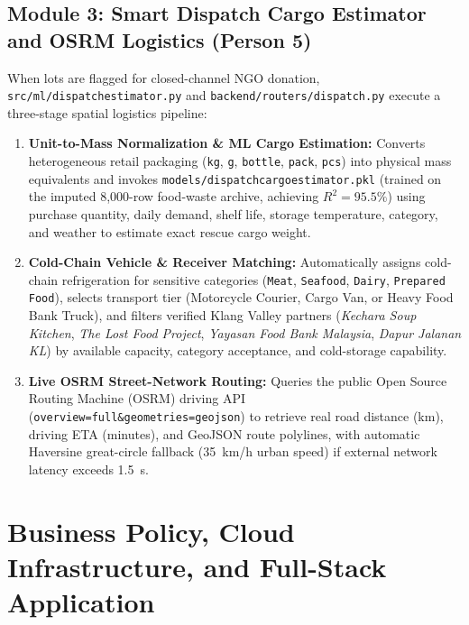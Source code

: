 \documentclass[11pt,a4paper]{article}
\renewcommand{\_}{\oldunderscore\allowbreak}
\begin{document}
\subsection{Module 3: Smart Dispatch Cargo Estimator and OSRM Logistics (Person 5)}
When lots are flagged for closed-channel NGO donation, \texttt{src/ml/dispatch\_estimator.py} and \texttt{backend/routers/dispatch.py} execute a three-stage spatial logistics pipeline:
\begin{enumerate}[leftmargin=18pt, itemsep=2pt]
    \item \textbf{Unit-to-Mass Normalization \& ML Cargo Estimation:} Converts heterogeneous retail packaging (\texttt{kg}, \texttt{g}, \texttt{bottle}, \texttt{pack}, \texttt{pcs}) into physical mass equivalents and invokes \texttt{models/dispatch\_cargo\_estimator.pkl} (trained on the imputed 8,000-row food-waste archive, achieving \textbf{$R^2 = 95.5\%$}) using purchase quantity, daily demand, shelf life, storage temperature, category, and weather to estimate exact rescue cargo weight.
    \item \textbf{Cold-Chain Vehicle \& Receiver Matching:} Automatically assigns cold-chain refrigeration for sensitive categories (\texttt{Meat}, \texttt{Seafood}, \texttt{Dairy}, \texttt{Prepared Food}), selects transport tier (Motorcycle Courier, Cargo Van, or Heavy Food Bank Truck), and filters verified Klang Valley partners (\emph{Kechara Soup Kitchen}, \emph{The Lost Food Project}, \emph{Yayasan Food Bank Malaysia}, \emph{Dapur Jalanan KL}) by available capacity, category acceptance, and cold-storage capability.
    \item \textbf{Live OSRM Street-Network Routing:} Queries the public Open Source Routing Machine (OSRM) driving API (\texttt{overview=full\&geometries=geojson}) to retrieve real road distance (km), driving ETA (minutes), and GeoJSON route polylines, with automatic Haversine great-circle fallback (35~km/h urban speed) if external network latency exceeds 1.5~s.
\end{enumerate}

\section{Business Policy, Cloud Infrastructure, and Full-Stack Application}
\end{document}
